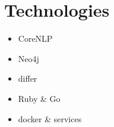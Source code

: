 \chapter{Technologies\label{chap:technologies}}
  \begin{itemize}
    \item{CoreNLP}
    \item{Neo4j}
    \item{differ}
    \item{Ruby \& Go}
    \item{docker \& services}
  \end{itemize}

